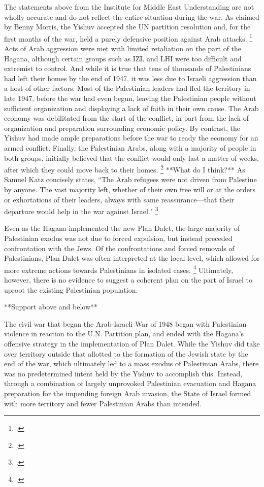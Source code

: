 \documentclass[12pt]{turabian-researchpaper}
\begin{document}
The statements above from the Institute for Middle East Understanding are not wholly accurate and do not reflect the entire situation during the war.  As claimed by Benny Morris, the Yishuv accepted the UN partition resolution and, for the first months of the war, held a purely defensive position against Arab attacks.
\footcite[][98-100]{morris}
Acts of Arab aggression were met with limited retaliation on the part of the Hagana, although certain groups such as IZL and LHI were too difficult and extremist to control.
And while it is true that tens of thousands of Palestinians had left their homes by the end of 1947, it was less due to Israeli aggression than a host of other factors.  Most of the Palestinian leaders had fled the territory in late 1947, before the war had even begun, leaving the Palestinian people without sufficient organization and displaying a lack of faith in their own cause.  The Arab economy was debilitated from the start of the conflict, in part from the lack of organization and preparation surrounding economic policy.  By contrast, the Yishuv had made ample preparations before the war to ready the economy for an armed conflict.  Finally, the Palestinian Arabs, along with a majority of people in both groups, initially believed that the conflict would only last a matter of weeks, after which they could move back to their homes.
\footcite[][84-85]{pappe}
**What do I think?**
As Samuel Katz concisely states, ``The Arab refugees were not driven from Palestine by anyone.  The vast majority left, whether of their own free will or at the orders or exhortations of their leaders, always with same reassurance—that their departure would help in the war against Israel."
\footcite[][64]{dajani}



Even as the Hagana implemented the new Plan Dalet, the large majority of Palestinian exodus was not due to forced expulsion, but instead preceded confrontation with the Jews.  Of the confrontations and forced removals of Palestinians, Plan Dalet was often interpreted at the local level, which allowed for more extreme actions towards Palestinians in isolated cases.
\footcite[][94]{morris}
Ultimately, however, there is no evidence to suggest a coherent plan on the part of Israel to uproot the existing Palestinian population.

**Support above and below**

The civil war that began the Arab-Israeli War of 1948 began with Palestinian violence in reaction to the U.N. Partition plan, and ended with the Hagana's offensive strategy in the implementation of Plan Dalet.  While the Yishuv did take over territory outside that allotted to the formation of the Jewish state by the end of the war, which ultimately led to a mass exodus of Palestinian Arabs, there was no predetermined intent held by the Yishuv to accomplish this.  Instead, through a combination of largely unprovoked Palestinian evacuation and Hagana preparation for the impending foreign Arab invasion, the State of Israel formed with more territory and fewer Palestinian Arabs than intended.
\end{document}
